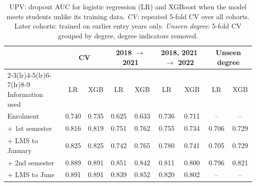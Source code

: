 \begin{table}[H]
\centering
\small
\setlength{\tabcolsep}{4pt}
\caption{UPV: dropout AUC for logistic regression (LR) and XGBoost when the model meets students unlike its training data. \emph{CV}: repeated 5-fold CV over all cohorts. Later cohorts: trained on earlier entry years only. \emph{Unseen degree}: 5-fold CV grouped by degree, degree indicators removed.}
\label{tab:upv_shift}
\begin{tabular}{lcccccccc}
\toprule
 & \multicolumn{2}{c}{CV} & \multicolumn{2}{c}{2018 $\to$ 2021} & \multicolumn{2}{c}{2018, 2021 $\to$ 2022} & \multicolumn{2}{c}{Unseen degree} \\
\cmidrule(lr){2-3}\cmidrule(lr){4-5}\cmidrule(lr){6-7}\cmidrule(lr){8-9}
Information used & LR & XGB & LR & XGB & LR & XGB & LR & XGB \\
\midrule
Enrolment & 0.740 & 0.735 & 0.625 & 0.633 & 0.736 & 0.711 & -- & -- \\
+ 1st semester & 0.816 & 0.819 & 0.751 & 0.762 & 0.755 & 0.734 & 0.706 & 0.729 \\
+ LMS to January & 0.825 & 0.825 & 0.742 & 0.765 & 0.780 & 0.741 & 0.705 & 0.729 \\
+ 2nd semester & 0.889 & 0.891 & 0.851 & 0.842 & 0.811 & 0.800 & 0.796 & 0.821 \\
+ LMS to June & 0.891 & 0.891 & 0.839 & 0.852 & 0.820 & 0.802 & -- & -- \\
\bottomrule
\end{tabular}
\end{table}
